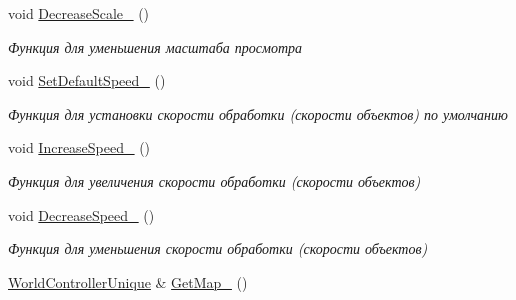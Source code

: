 \begin{DoxyCompactItemize}
\mbox{\label{classrtm_1_1_world_scene_a9a829874403c855a0550bc67328137eb}} 
void \hyperlink{classrtm_1_1_world_scene_a9a829874403c855a0550bc67328137eb}{Decrease\+Scale\+\_\+} ()
\begin{DoxyCompactList}\small\item\em Функция для уменьшения масштаба просмотра \end{DoxyCompactList}\item 
\mbox{\label{classrtm_1_1_world_scene_adc5d821ae3e32726e18548f306e262f9}} 
void \hyperlink{classrtm_1_1_world_scene_adc5d821ae3e32726e18548f306e262f9}{Set\+Default\+Speed\+\_\+} ()
\begin{DoxyCompactList}\small\item\em Функция для установки скорости обработки (скорости объектов) по умолчанию \end{DoxyCompactList}\item 
\mbox{\label{classrtm_1_1_world_scene_a14462131111d322d70d8b3f790bae9e3}} 
void \hyperlink{classrtm_1_1_world_scene_a14462131111d322d70d8b3f790bae9e3}{Increase\+Speed\+\_\+} ()
\begin{DoxyCompactList}\small\item\em Функция для увеличения скорости обработки (скорости объектов) \end{DoxyCompactList}\item 
\mbox{\label{classrtm_1_1_world_scene_a44f1fb67e2c1357680e14d143612626f}} 
void \hyperlink{classrtm_1_1_world_scene_a44f1fb67e2c1357680e14d143612626f}{Decrease\+Speed\+\_\+} ()
\begin{DoxyCompactList}\small\item\em Функция для уменьшения скорости обработки (скорости объектов) \end{DoxyCompactList}\item 
\hyperlink{namespacertm_a3081db54851f6008db32c1ee28d14ecf}{World\+Controller\+Unique} \& \hyperlink{classrtm_1_1_world_scene_a8995a69857907834953be1bb2ccb2845}{Get\+Map\+\_\+} ()
\end{DoxyCompactItemize}
